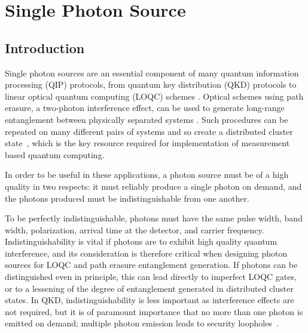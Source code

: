 \chapter{Single Photon Source} 
\label{ch:SinglePhotonSource}

\section{Introduction}

Single photon sources are an essential component of many quantum information processing (QIP) protocols, from quantum key distribution (QKD) protocols \cite{bb84, ekert:91} to linear optical quantum computing (LOQC) schemes \cite{knill:2001, kok07, kok10}.
Optical schemes using path erasure, a two-photon interference effect, can be used to generate long-range entanglement between physically separated systems  \cite{barrett+kok, bose99, simon:03, lim05}. Such procedures can be repeated on many different pairs of systems and so create a distributed cluster state~\cite{raussendorf01,kok10}, which is the key resource required for implementation of measurement based quantum computing.

In order to be useful in these applications, a photon source must be of a high quality in two respects: it must reliably produce a single photon on demand, and the photons produced must be indistinguishable from one another. 

To be perfectly indistinguishable, photons must have the same pulse width, band width, polarization, arrival time at the detector, and carrier frequency. Indistinguishability is vital if photons are to exhibit high quality quantum interference, and its consideration is therefore critical when designing photon sources for LOQC and path erasure entanglement generation.
If photons can be distinguished even in principle, this can lead directly to imperfect LOQC gates, or to a lessening of the degree of entanglement generated in distributed cluster states. In QKD, indistinguishability is less important as interference effects are not required, but it is of paramount importance that no more than one photon is emitted on demand; multiple photon emission leads to security loopholes~\cite{kok10}.


